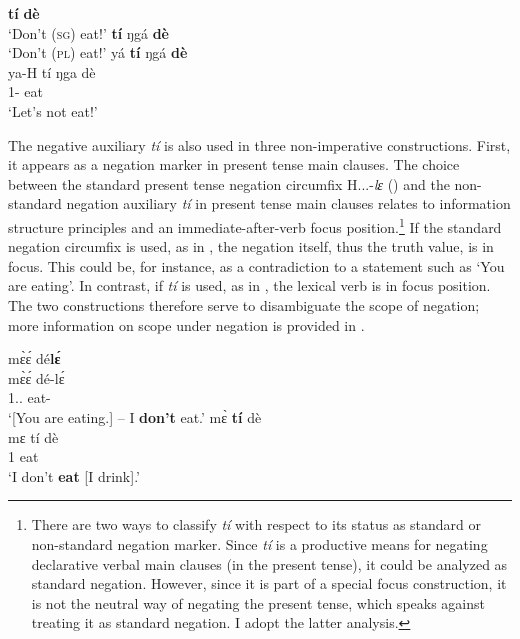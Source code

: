 \documentclass[output=paper,colorlinks=true, citecolor=brown,draftmode]{langscibook}
\begin{document}
\ea\label{IMPneg} 
    \ea\label{IMPnega} {\bfseries tí} {\bfseries dè} \\
        \trans `Don't (\textsc{sg}) eat!'
    \ex\label{IMPnegb} {\bfseries tí} ŋgá {\bfseries dè} \\
        \trans `Don't (\textsc{pl}) eat!'
    \ex\label{IMPnegc} 
        \glll yá {\bfseries tí} ŋgá {\bfseries dè} \\
              ya-H tí ŋga dè \\
        	1{\PL}-{\PRS} {\NEG} {\PL} eat \\
        \trans `Let's not eat!'
    \z
\z

The negative auxiliary {\itshape tí} is also used in three non-imperative constructions.  First, it appears as a negation marker in present tense main clauses.
The choice between the standard present tense negation circumfix H...-{\itshape lɛ} () and the non-standard negation auxiliary {\itshape tí} in present tense main clauses relates to information structure principles and an immediate-after-verb focus position.\footnote{There are two ways to classify {\itshape tí} with respect to its status as standard or non-standard negation marker. Since {\itshape tí} is a productive means for negating declarative verbal main clauses (in the present tense), it could be analyzed as standard negation. However,
since it is part of a special focus construction, it is not the neutral way of negating the present tense, which speaks against treating it as standard negation.
I adopt the latter analysis.} If the standard negation circumfix is used, as in , the negation itself, thus the truth value, is in focus. This could be, for instance, as a contradiction to a statement such as `You are eating'. In contrast, if {\itshape tí} is used, as in , the lexical verb is in focus position. The two constructions therefore serve to disambiguate the scope of negation; more information on scope under negation is provided in . 

\ea\label{tile}
\ea\label{tilea}
  \glll  mɛ̀ɛ́ dé{\bfseries lɛ́} \\
        mɛ̀ɛ́ dé-lɛ́ \\
         1{\SG}.{\PRS}.{\NEG} eat-{\NEG}    \\
    \trans `[You are eating.] -- I \textbf{don't} eat.'  
\ex\label{tileb}
  \glll  mɛ̀ {\bfseries tí} dè\\
         mɛ tí dè \\
          1{\SG} {\NEG}  eat   \\
    \trans `I don't \textbf{eat} [I drink].' 
\z
\z
\end{document}
